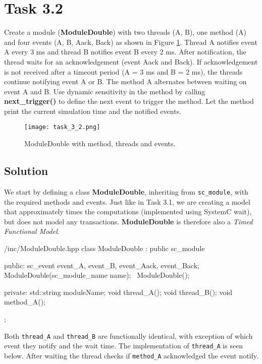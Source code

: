 \documentclass[../main.tex]{subfiles}
\begin{document}
\section{Task 3.2}

Create a module (\textbf{ModuleDouble}) with two threads (A, B), one method (A) and four events (A, B, Aack, Back) as shown in Figure \ref{fig:moduledouble}. Thread A notifies event A every 3 ms and thread B notifies event B every 2 ms. After notification, the thread waits for an acknowledgement (event Aack and Back). If acknowledgement is not received after a timeout period (A = 3 ms and B = 2 ms), the threads continue notifying event A or B. The method A alternates between waiting on event A and B. Use dynamic sensitivity in the method by calling \textbf{next\_trigger()} to define the next event to trigger the method. Let the method print the current simulation time and the notified events.

\begin{figure}[h]
    \centering
    \texttt{[image: task\_3\_2.png]}
    \caption{ModuleDouble with method, threads and events.}
    \label{fig:moduledouble}
\end{figure}

\subsection*{Solution}

We start by defining a class \textbf{ModuleDouble}, inheriting from \texttt{sc\_module}, with the required methods and events. Just like in Task 3.1, we are creating a model that approximately times the computations (implemented using SystemC wait), but does not model any transactions. \textbf{ModuleDouble} is therefore also a \textit{Timed Functional Model}.

\begin{myminted}{/inc/ModuleDouble.hpp}
class ModuleDouble : public sc_module {
public:
    sc_event event_A, event_B, event_Aack, event_Back;
    ModuleDouble(sc_module_name name);
    ~ModuleDouble();

private:
    std::string moduleName;
    void thread_A();
    void thread_B();
    void method_A();
};
\end{myminted}

\newpage

Both \texttt{thread\_A} and \texttt{thread\_B} are functionally identical, with exception of which event they notify and the wait time. The implementation of \texttt{thread\_A} is seen below. After waiting the thread checks if \texttt{method\_A} acknowledged the event notify.
\end{document}
